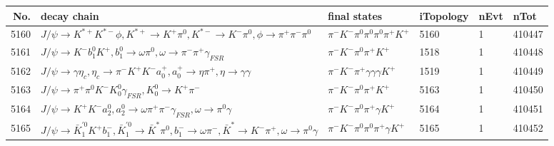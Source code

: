 \begin{table}[htbp] 
\begin{center}
\begin{small}
\begin{tabular}{rlllll}\hline\hline
 No. & decay chain & final states &  iTopology & nEvt & nTot \\\hline
5160&$J/\psi       \rightarrow K^{*+}         K^{*-}         \phi           , K^{*+}          \rightarrow K^{+}          \pi^{0}        , K^{*-}          \rightarrow K^{-}          \pi^{0}        , \phi            \rightarrow \pi^{+}        \pi^{-}        \pi^{0}        $&$\pi^{-}        K^{-}          \pi^{0}        \pi^{0}        \pi^{0}        \pi^{+}        K^{+}          $& 5160&    1&410447\\
5161&$J/\psi       \rightarrow K^{-}          b_{1}^{0}      K^{+}          , b_{1}^{0}       \rightarrow \omega         \pi^{0}        , \omega          \rightarrow \pi^{-}        \pi^{+}        \gamma_{FSR} $&$\pi^{-}        K^{-}          \pi^{0}        \pi^{+}        K^{+}          $& 1518&    1&410448\\
5162&$J/\psi       \rightarrow \gamma       \eta_{c}    , \eta_{c}     \rightarrow \pi^{-}        K^{+}          K^{-}          a_{0}^{+}      , a_{0}^{+}       \rightarrow \eta          \pi^{+}        , \eta           \rightarrow \gamma       \gamma       $&$\pi^{-}        K^{-}          \pi^{+}        \gamma       \gamma       \gamma       K^{+}          $& 1519&    1&410449\\
5163&$J/\psi       \rightarrow \pi^{+}        \pi^{0}        K^{-}          K_0^{0}        \gamma_{FSR} , K_0^{0}         \rightarrow K^{+}          \pi^{-}        $&$\pi^{-}        K^{-}          \pi^{0}        \pi^{+}        K^{+}          $& 5163&    1&410450\\
5164&$J/\psi       \rightarrow K^{+}          K^{-}          a_{2}^{0}      , a_{2}^{0}       \rightarrow \omega         \pi^{+}        \pi^{-}        \gamma_{FSR} , \omega          \rightarrow \pi^{0}        \gamma       $&$\pi^{-}        K^{-}          \pi^{0}        \pi^{+}        \gamma       K^{+}          $& 5164&    1&410451\\
5165&$J/\psi       \rightarrow \bar{K}_1^{'0}K^{+}          b_{1}^{-}      , \bar{K}_1^{'0} \rightarrow \bar{K}^{*}   \pi^{0}        , b_{1}^{-}       \rightarrow \omega         \pi^{-}        , \bar{K}^{*}    \rightarrow K^{-}          \pi^{+}        , \omega          \rightarrow \pi^{0}        \gamma       $&$\pi^{-}        K^{-}          \pi^{0}        \pi^{0}        \pi^{+}        \gamma       K^{+}          $& 5165&    1&410452\\

\end{tabular}
\end{small}
\end{center}
\end{table}
